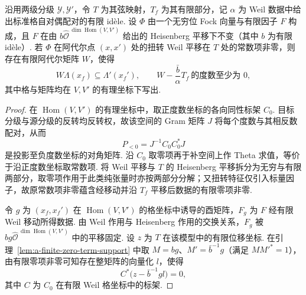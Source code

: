 \begin{lemma}[非零弦常数项的格映射]
\label{lem:a-frequency-negative-degree}
\emitthmsource
沿用两级分级 $\mathcal Y,\mathcal Y'$，令 $T$ 为其弦映射，$T_f$ 为其有限部分，记 $\alpha$ 为 Weil 数据中给出标准格自对偶配对的有限 idèle. 设 $\Phi$ 由一个无穷位 Fock 向量与有限因子 $F$ 构成，且 $F$ 在由 $b\widehat{\mathcal O}^{\,\dim\operatorname{Hom}(V,V')}$ 给出的 Heisenberg 平移下不变（其中 $b$ 为有限 idèle）. 若 $\Phi$ 在阿代尔点 $(x,x')$ 处的扭转 Weil 平移在 $T$ 处的常数项非零，则存在有限阿代尔矩阵 $W$，使得
\[
  W\Lambda(x_f)\subseteq\Lambda'(x_f'),
  \qquad
  W-\frac{\bar b}{\alpha}T_f\ \text{的度数至少为 }0 ,
\]
其中格与矩阵均在 $V,V'$ 的有理坐标下写出.
\end{lemma}
\begin{proof}
在 $\operatorname{Hom}(V,V')$ 的有理坐标中，取正度数坐标的各向同性标架 $C_0$. 目标分级与源分级的反转均反转权，故该空间的 Gram 矩阵 $J$ 将每个度数与其相反数配对，从而
\[
 P_{<0}=J^{-1}C_0C_0^\ast J
\]
是投影至负度数坐标的对角矩阵. 沿 $C_0$ 取零项再于补空间上作 Theta 求值，等价于沿正度数坐标取常数项. 将 Weil 平移与 $T$ 的 Heisenberg 平移拆分为无穷与有限两部分，取零项作用于此类纯张量时亦按两部分分解；又扭转特征仅引入标量因子，故原常数项非零蕴含经移动并沿 $T_f$ 平移后数据的有限零项非零.

令 $g$ 为 $(x_f,x_f')$ 在 $\operatorname{Hom}(V,V')$ 的格坐标中诱导的酉矩阵，$F_g$ 为 $F$ 经有限 Weil 移动所得数据. 由 Weil 作用与 Heisenberg 作用的交换关系，$F_g$ 被 $bg\widehat{\mathcal O}^{\,\dim\operatorname{Hom}(V,V')}$ 中的平移固定. 设 $z$ 为 $T$ 在该模型中的有限位移坐标. 在引理~\ref{lem:a-finite-zero-term-support} 中取 $M=bg$、$M'=\bar b^{-1}g$（满足 $MM'^\ast=1$），由有限零项非零可知存在整矩阵的向量化 $l$，使得
\[
 C^\ast\bigl(z-\bar b^{-1} g l\bigr)=0,
\]
其中 $C$ 为 $C_0$ 在有限 Weil 格坐标中的标架.


\end{proof}
